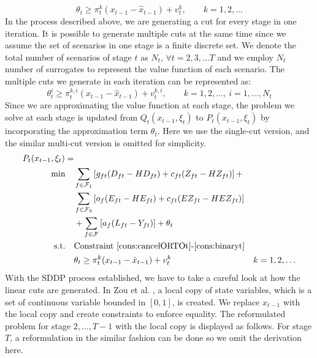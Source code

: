 \documentclass[12pt]{article}
\begin{document}
	\begin{equation}
		\theta_t \geq \pi_t^k(x_{t-1} - \hat{x}_{t-1}) + v_t^k, \qquad k = 1, 2, \dots
	\end{equation}
	In the process described above, we are generating a cut for every stage in one iteration. It is possible to generate multiple cuts at the same time since we assume the set of scenarios in one stage is a finite discrete set. We denote the total number of scenarios of stage \(t\) as \(N_t\), \(\forall t = 2,3, \dots T\) and we employ \(N_t\) number of surrogates to represent the value function of each scenario. The multiple cuts we generate in each iteration can be represented as:
	\begin{equation}
		\theta_t^i \geq \pi_t^{k,i}(x_{t-1} - \hat{x}_{t-1}) + v_t^{k,i}, \qquad k = 1, 2, \dots,\ i = 1, \dots, N_t
	\end{equation}
	Since we are approximating the value function at each stage, the problem we solve at each stage is updated from \(Q_t(x_{t-1},\xi_t)\) to \(P_t(x_{t - 1}, \xi_t)\) by incorporating the approximation term \(\theta_t\). Here we use the single-cut version, and the similar multi-cut version is omitted for simplicity.
	\begin{subequations}
		\begin{align}
			P_t(x_{t-1},\xi_t) = & & \\
			\min \quad & \sum_{f \in \mathcal{F}_1} \left[ g_{ft} (D_{ft} - HD_{ft}) + c_{ft} (Z_{ft} - HZ_{ft}) \right]  + & \nonumber \\
			& \sum_{f \in \mathcal{F}_3} \left[ o_f(E_{ft} - HE_{ft}) + c_{ft}(EZ_{ft} - HEZ_{ft}) \right]& \nonumber\\ 
			& +\sum_{f \in \mathcal{F}} \left[ a_f (L_{ft} - Y_{ft})\right]  + \theta_t &\\
			\text{s.t.} \quad & \text{Constraint \eqref{cons:cancelORTOt}-\eqref{cons:binaryt}} & \\
			& \theta_t \geq \pi_t^k(x_{t-1} - \hat{x}_{t-1}) + v_t^k & k = 1, 2, \dots
		\end{align}
	\end{subequations}
	\noindent With the SDDP process established, we have to take a careful look at how the linear cuts are generated. In Zou et al. \cite{zou2016nested}, a local copy of state variables, which is a set of continuous variable bounded in \([0,1]\), is created. We replace \(x_{t-1}\) with the local copy and create constraints to enforce equality. The reformulated problem for stage \(2, \dots, T-1\) with the local copy is displayed as follows. For stage \(T\), a reformulation in the similar fashion can be done so we omit the derivation here.
\end{document}
